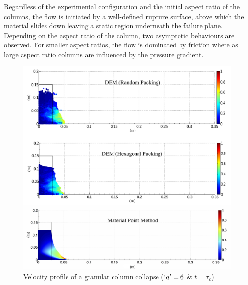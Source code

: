Regardless of the experimental configuration and the initial aspect ratio of 
the columns, the flow is initiated by a well-defined rupture surface, above 
which the material slides down leaving a static region underneath the failure 
plane. Depending on the aspect ratio of the column, two asymptotic behaviours 
are observed. For smaller aspect ratios, the flow is dominated by friction 
where as large aspect ratio columns are influenced by the pressure gradient.

\begin{figure}[tbhp]
\centering
\includegraphics[width=\textwidth]{a6tc}
\caption{Velocity profile of a granular column collapse ($`a' = 6$ \& 
$t=\tau_c$)}
\label{fig:a6tc}
\end{figure}

